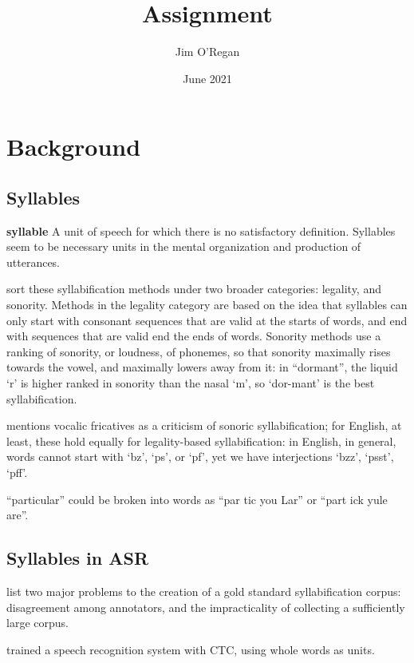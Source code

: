 \documentclass{article}[11pt]
\title{Assignment}
\author{Jim O'Regan}
\date{June 2021}
\begin{document}
\maketitle

\section{Background}

\subsection{Syllables}

\begin{displayquote}
\textbf{syllable} A unit of speech for which there is
no satisfactory definition. Syllables seem to
be necessary units in the mental organization and production of utterances.~\citep{ladefoged_course_2011}
\end{displayquote}

\citet{goslin_comparing_2007} sort these syllabification methods under two broader categories: legality, and sonority. Methods in the legality category are based on the idea that syllables can only start with consonant sequences that are valid at the starts of words, and end with sequences that are valid end the ends of words. Sonority methods use a ranking of sonority, or loudness, of phonemes, so that sonority maximally rises towards the vowel, and maximally lowers away from it: in ``dormant'', the liquid `r' is higher ranked in sonority than the nasal `m', so `dor-mant' is the best syllabification.

\citet{saussure_course_1959} mentions vocalic fricatives as a criticism of sonoric syllabification; for English, at least, these hold equally for legality-based syllabification: in English, in general, words cannot start with `bz', `ps', or `pf', yet we have interjections `bzz', `psst', `pff'.

``particular'' could be broken into words as ``par tic you Lar'' or ``part ick yule are''.

\subsection{Syllables in ASR}

\citep{fujimura_syllable_1975}

\citet{marchand_automatic_2009} list two major problems to the creation of a gold standard syllabification corpus: disagreement among annotators, and the impracticality of collecting a sufficiently large corpus.

\citet{soltau_neural_2017} trained a speech recognition system with CTC, using whole words as units.



%
\end{document}
